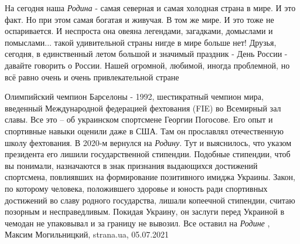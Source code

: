 На сегодня наша \emph{Родина} - самая северная и самая холодная страна в мире. И это
факт. Но при этом самая богатая и живучая. В том же мире. И это тоже не
оспаривается. И неспроста она овеяна легендами, загадками, домыслами и
помыслами... такой удивительной страны нигде в мире больше нет!  Друзья,
сегодня, в единственный летом большой и значимый праздник - День России -
давайте говорить о России. Нашей огромной, любимой, иногда проблемной, но всё
равно очень и очень привлекательной стране
  

Олимпийский чемпион Барселоны - 1992, шестикратный чемпион мира, введенный
Международной федерацией фехтования (FIE) во Всемирный зал славы. Все это – об
украинском спортсмене Георгии Погосове.  Его опыт и спортивные навыки оценили
даже в США. Там он прославлял отечественную школу фехтования. В 2020-м вернулся
на \emph{Родину}. Тут и выяснилось, что указом президента его лишили
государственной стипендии.  Подобные стипендии, чтоб вы понимали, назначаются в
знак признания выдающихся достижений спортсмена, повлиявших на формирование
позитивного имиджа Украины.  Закон, по которому человека, положившего здоровье
и юность ради спортивных достижений во славу родного государства, лишали
копеечной стипендии, считаю позорным и несправедливым. Покидая Украину, он
заслуги перед Украиной в чемодан не упаковывал и за границу не вывозил. Все
оставил на \emph{Родине}
, 
Максим Могильницкий, strana.ua, 05.07.2021

